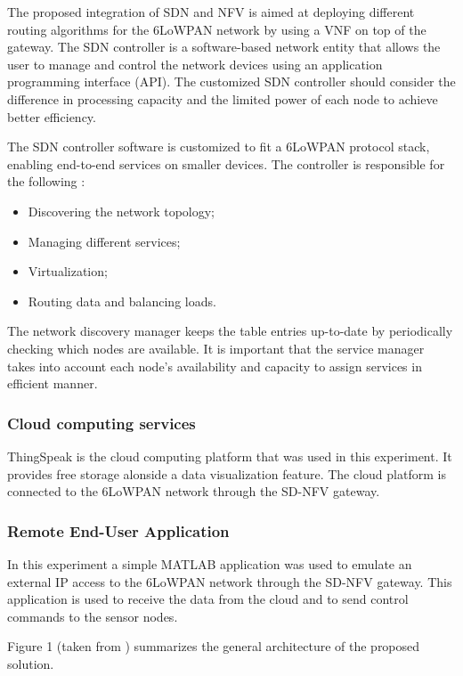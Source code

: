 \documentclass[10pt,journal,compsoc]{IEEEtran}
\begin{document}
The proposed integration of SDN and NFV is aimed at deploying different 
routing algorithms for the 6LoWPAN network by using a VNF on top of 
the gateway. The SDN controller is a software-based network entity 
that allows the user to manage and control the network devices using 
an application programming interface (API). The customized SDN controller 
should consider the difference in processing capacity and the limited 
power of each node to achieve better efficiency. 

The SDN controller software is customized to fit a 6LoWPAN protocol stack, 
enabling end-to-end services on smaller devices. The controller is 
responsible for the following :

\begin{itemize}
    \item Discovering the network topology;
    \item Managing different services;
    \item Virtualization;
    \item Routing data and balancing loads.
\end{itemize}

The network discovery manager keeps the table entries up-to-date 
by periodically checking which nodes are available. It is important that 
the service manager takes into account each node's availability and 
capacity to assign services in efficient manner.

\subsubsection{Cloud computing services}

ThingSpeak \cite{thingspeak} is the cloud computing platform that was 
used in this experiment. It provides free storage alonside a data 
visualization feature. The cloud platform is connected to the 6LoWPAN 
network through the SD-NFV gateway. 

\subsubsection{Remote End-User Application}

In this experiment a simple MATLAB application was used to 
emulate an external IP access to the 6LoWPAN network through the 
SD-NFV gateway. This application is used to receive the data from the 
cloud and to send control commands to the sensor nodes.

Figure 1 (taken from \cite{main}) summarizes the general architecture 
of the proposed solution.
\end{document}

